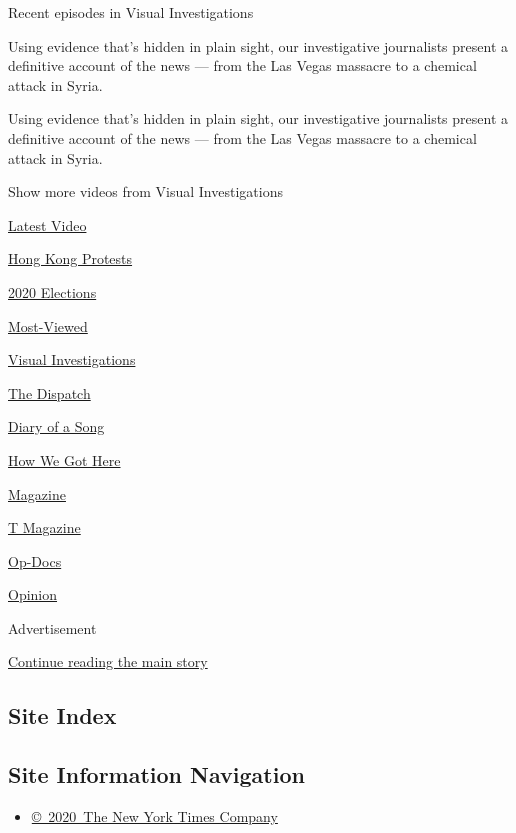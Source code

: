 Recent episodes in Visual Investigations

Using evidence that's hidden in plain sight, our investigative
journalists present a definitive account of the news --- from the Las
Vegas massacre to a chemical attack in Syria.

Using evidence that's hidden in plain sight, our investigative
journalists present a definitive account of the news --- from the Las
Vegas massacre to a chemical attack in Syria.

Show more videos from Visual Investigations

\href{/video}{}

\href{/video/latest-video}{Latest Video}

\href{/video/hk-protest}{Hong Kong Protests}

\href{/video/2020-Elections}{2020 Elections}

\href{/video/Most-Viewed}{Most-Viewed}

\href{/video/investigations}{Visual Investigations}

\href{/video/on-the-ground}{The Dispatch}

\href{/video/diaryofasong}{Diary of a Song}

\href{/video/how-we-got-here}{How We Got Here}

\href{/video/magazine}{Magazine}

\href{/video/t-magazine}{T Magazine}

\href{/video/op-docs}{Op-Docs}

\href{/video/opinion}{Opinion}

Advertisement

\protect\hyperlink{after-bottom}{Continue reading the main story}

\hypertarget{site-index}{%
\subsection{Site Index}\label{site-index}}

\hypertarget{site-information-navigation}{%
\subsection{Site Information
Navigation}\label{site-information-navigation}}

\begin{itemize}
\tightlist
\item
  \href{https://help.nytimes3xbfgragh.onion/hc/en-us/articles/115014792127-Copyright-notice}{©~2020~The
  New York Times Company}
\end{itemize}

